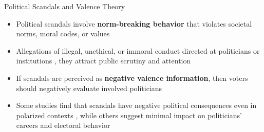 \documentclass[10pt, aspectratio=169]{beamer}
\newcommand{\customcite}[1]{\textcolor{blue}{\parencite{#1}}}
\newcommand{\customcites}[1]{\textcolor{blue}{\parencites{#1}}}
\begin{document}

\begin{frame}{Political Scandals and Valence Theory}
    \begin{itemize}
        \item Political scandals involve \textbf{norm-breaking behavior} that violates societal norms, moral codes, or values \customcites{genovese_2010, Thompson_2013} \vspace{0.3cm}
        \item Allegations of illegal, unethical, or immoral conduct directed at politicians or institutions \customcite{Rottinghaus_2023}, they attract public scrutiny and attention \customcites{Thompson_2013, Marion_2010}\vspace{0.2cm}
        \item If scandals are perceived as \textbf{negative valence information}, then voters should negatively evaluate involved politicians \customcites{doherty2014does, Rottinghaus_2023} \vspace{0.3cm}
        \item Some studies find that scandals have negative political consequences even in polarized contexts \customcites{darr2019collision, wolsky2022scandal}, while others suggest minimal impact on politicians' careers and electoral behavior \customcites{funck2021partisanship, Lee_2023}
    \end{itemize}
\end{frame}
\end{document}
